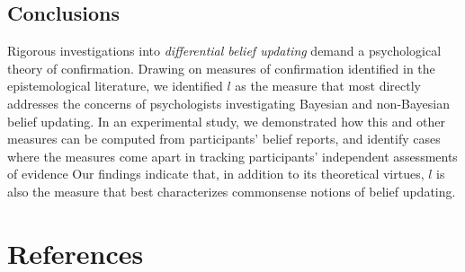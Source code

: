 \documentclass[10pt, letterpaper]{article}
\begin{document}
\hypertarget{conclusions}{%
\subsection{Conclusions}\label{conclusions}}

Rigorous investigations into \emph{differential belief updating} demand
a psychological theory of confirmation. Drawing on measures of
confirmation identified in the epistemological literature, we identified
\(l\) as the measure that most directly addresses the concerns of
psychologists investigating Bayesian and non-Bayesian belief updating.
In an experimental study, we demonstrated how this and other measures
can be computed from participants' belief reports, and identify cases
where the measures come apart in tracking participants' independent
assessments of evidence Our findings indicate that, in addition to its
theoretical virtues, \(l\) is also the measure that best characterizes
commonsense notions of belief updating.

\hypertarget{references}{%
\section{References}\label{references}}

\setlength{\parindent}{-0.1in} 
\setlength{\leftskip}{0.125in}

\noindent
\end{document}
